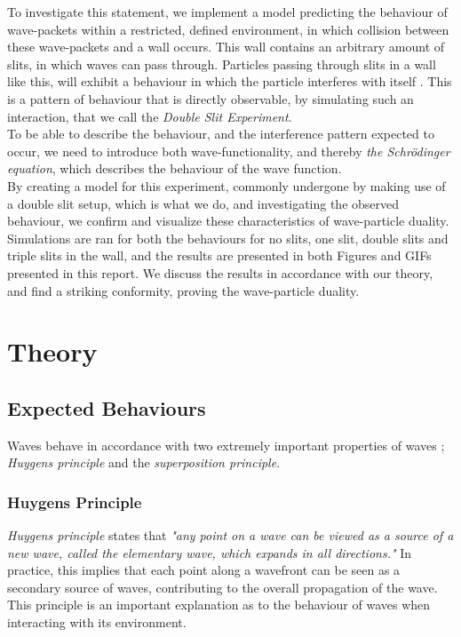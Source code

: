\documentclass[10pt, nofootinbib, twocolumn]{revtex4-1}
\begin{document}
To investigate this statement, we implement a model predicting the behaviour of wave-packets within a restricted, defined environment, in which collision between these wave-packets and a wall occurs. This wall contains an arbitrary amount of slits, in which waves can pass through. Particles passing through slits in a wall like this, will exhibit a behaviour in which the particle interferes with itself \cite{kvante}. This is a pattern of behaviour that is directly observable, by simulating such an interaction, that we call the \textit{Double Slit Experiment}. \\

\vspace*{1\baselineskip}
To be able to describe the behaviour, and the interference pattern expected to occur, we need to introduce both wave-functionality, and thereby \textit{the Schrödinger equation}, which describes the behaviour of the wave function. \\

By creating a model for this experiment, commonly undergone by making use of a double slit setup, which is what we do, and investigating the observed behaviour, we confirm and visualize these characteristics of wave-particle duality. Simulations are ran for both the behaviours for no slits, one slit, double slits and triple slits in the wall, and the results are presented in both Figures and GIFs presented in this report. We discuss the results in accordance with our theory, and find a striking conformity, proving the wave-particle duality.




\clearpage
\section{Theory}\label{sec:theory}
\subsection{Expected Behaviours}\label{sec:behaviour}
Waves behave in accordance with two extremely important properties of waves ; \textit{Huygens principle} and the \textit{superposition principle}.

\subsubsection{Huygens Principle}
\textit{Huygens principle} \cite{oscillations} states that \textit{"any point on a wave can be viewed as a source of a new wave, called the elementary wave, which expands in all directions."} In practice, this implies that each point along a wavefront can be seen as a secondary source of waves, contributing to the overall propagation of the wave. This principle is an important explanation as to the behaviour of waves when interacting with its environment. 
\end{document}
